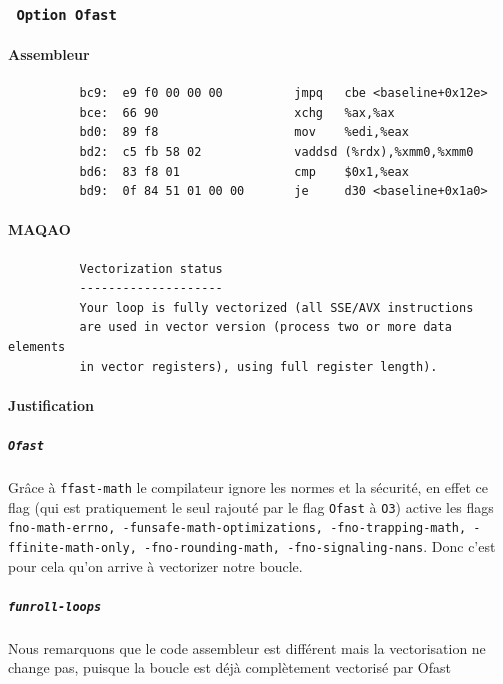 \documentclass{report}
\begin{document}
      \subsubsection{ \texttt{ Option Ofast } }
      \paragraph{Assembleur}
        \begin{verbatim}
          bc9:	e9 f0 00 00 00       	jmpq   cbe <baseline+0x12e>
          bce:	66 90                	xchg   %ax,%ax
          bd0:	89 f8                	mov    %edi,%eax
          bd2:	c5 fb 58 02          	vaddsd (%rdx),%xmm0,%xmm0
          bd6:	83 f8 01             	cmp    $0x1,%eax
          bd9:	0f 84 51 01 00 00    	je     d30 <baseline+0x1a0>
        \end{verbatim}
      \paragraph{MAQAO}
        \begin{verbatim}
          Vectorization status
          --------------------
          Your loop is fully vectorized (all SSE/AVX instructions
          are used in vector version (process two or more data elements
          in vector registers), using full register length).
        \end{verbatim}
	      \paragraph{Justification}
        \subparagraph{\texttt{Ofast}}
	      Grâce à \texttt{ffast-math} le compilateur ignore les normes et la sécurité, en effet ce flag
        (qui est pratiquement le seul rajouté par le flag \texttt{Ofast} à \texttt{O3}) active les flags
        \texttt{ fno-math-errno, -funsafe-math-optimizations, -fno-trapping-math, -ffinite-math-only, -fno-rounding-math, -fno-signaling-nans}.
        Donc c'est pour cela qu'on arrive à vectorizer notre boucle.
        \subparagraph{\texttt{funroll-loops}}
        Nous remarquons que le code assembleur est différent mais la vectorisation ne change pas, puisque la boucle
        est déjà complètement vectorisé par Ofast
\end{document}
